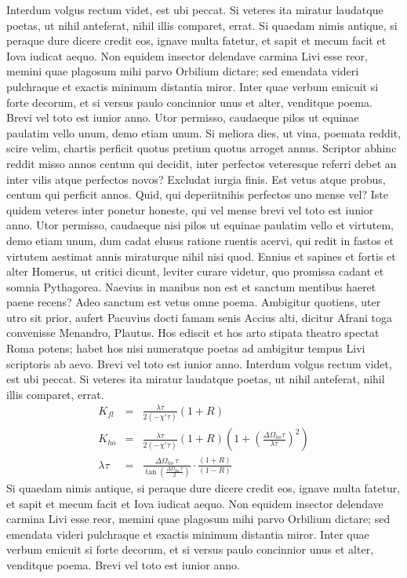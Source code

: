 \documentclass[article,colorback,accentcolor=tud4c]{tudreport}
\begin{document}
    Interdum volgus rectum videt, est ubi peccat. Si veteres ita miratur laudatque poetas, ut nihil anteferat, nihil illis comparet, errat.  Si quaedam nimis antique, si peraque dure dicere credit eos, ignave multa fatetur, et sapit et mecum facit et Iova iudicat aequo. Non equidem insector delendave carmina Livi esse reor, memini quae plagosum mihi parvo Orbilium dictare; sed emendata videri pulchraque et exactis minimum distantia miror. Inter quae verbum emicuit si forte decorum, et si versus paulo concinnior unus et alter, venditque poema. Brevi vel toto est iunior anno. Utor permisso, caudaeque pilos ut equinae paulatim vello unum, demo etiam unum. Si meliora dies, ut vina, poemata reddit, scire velim, chartis perficit quotus pretium quotus arroget annus. Scriptor abhinc reddit misso annos centum qui decidit, inter perfectos veteresque referri debet an inter vilis atque perfectos novos? Excludat iurgia finis.
    Est vetus atque probus, centum qui perficit annos. Quid, qui deperiitnihis perfectos uno mense vel? Iste quidem veteres inter ponetur honeste, qui vel mense brevi vel toto est iunior anno. Utor permisso, caudaeque nisi pilos ut equinae paulatim vello et virtutem, demo etiam unum, dum cadat elusus ratione ruentis acervi, qui redit in fastos et virtutem aestimat annis miraturque nihil nisi quod. Ennius et sapines et fortis et alter Homerus, ut critici dicunt, leviter curare videtur, quo promissa cadant et somnia Pythagorea.  Naevius in manibus non est et sanctum mentibus haeret paene recens?  Adeo sanctum est vetus omne poema. Ambigitur quotiens, uter utro sit prior, aufert Pacuvius docti famam senis Accius alti, dicitur Afrani toga convenisse Menandro, Plautus. Hos ediscit et hos arto stipata theatro spectat Roma potens; habet hos nisi numeratque poetas ad ambigitur tempus Livi scriptoris ab aevo. Brevi vel toto est iunior anno. Interdum volgus rectum videt, est ubi peccat. Si veteres ita miratur laudatque poetas, ut nihil anteferat, nihil illis comparet, errat. 
	\begin{eqnarray}
		K_{fl}&=&\frac{\lambda\tau}{2(-\chi'\tau)}(1+R)\\
		K_{ho}&=&\frac{\lambda\tau}{2(-\chi'\tau)}(1+R)
			\left(1+\left(\frac{\Delta\Omega_{ho}\tau}{\lambda\tau}\right)^2\right)
			\\
		\lambda\tau&=&
			\frac{\Delta\Omega_{ho}\,\tau}{\tan\left(\frac{\Delta\Omega_{ho}\,\tau}{2}
			\right)}\cdot\frac{(1+R)}{(1-R)}
	\end{eqnarray}
    Si quaedam nimis antique, si peraque dure dicere credit eos, ignave multa fatetur, et sapit et mecum facit et Iova iudicat aequo. Non equidem insector delendave carmina Livi esse reor, memini quae plagosum mihi parvo Orbilium dictare; sed emendata videri pulchraque et exactis minimum distantia miror. Inter quae verbum emicuit si forte decorum, et si versus paulo concinnior unus et alter, venditque poema. Brevi vel toto est iunior anno.
\end{document}
